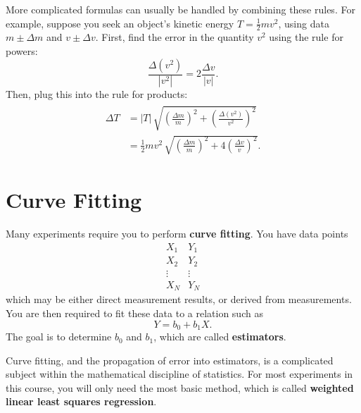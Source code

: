 \documentclass[11pt,a4paper]{article}
\begin{document}
More complicated formulas can usually be handled by combining these
rules.  For example, suppose you seek an object's kinetic energy $T =
\frac{1}{2}mv^2$, using data $m \pm \Delta m$ and $v \pm \Delta v$.
First, find the error in the quantity $v^2$ using the rule for powers:
\begin{equation*}
  \frac{\Delta (v^2)}{|v^2|} = 2 \frac{\Delta v}{|v|}.
\end{equation*}
Then, plug this into the rule for products:
\begin{align}
  \begin{aligned}
    \Delta T &= |T|\, \sqrt{\left(\frac{\Delta m}{m}\right)^2
      + \left(\frac{\Delta (v^2)}{v^2}\right)^2} \\
    &= \frac{1}{2} m v^2\, \sqrt{\left(\frac{\Delta m}{m}\right)^2
      + 4 \left(\frac{\Delta v}{v}\right)^2}.
  \end{aligned} \nonumber
\end{align}

\section{Curve Fitting}
\label{sec:curvefit}

Many experiments require you to perform \textbf{curve fitting}.  You
have data points
\begin{equation*}
  \begin{array}{c}X_1 \\ X_2 \\ \vdots \\ X_N \end{array}
  \begin{array}{c}Y_1 \\ Y_2 \\ \vdots \\ Y_N \end{array}
\end{equation*}
which may be either direct measurement results, or derived from
measurements.  You are then required to fit these data to a relation
such as
\begin{equation*}
  Y = b_0 + b_1 X.
\end{equation*}
The goal is to determine $b_0$ and $b_1$, which are called
\textbf{estimators}.

Curve fitting, and the propagation of error into estimators, is a
complicated subject within the mathematical discipline of statistics.
For most experiments in this course, you will only need the most basic
method, which is called \textbf{weighted linear least squares
  regression}.
\end{document}
